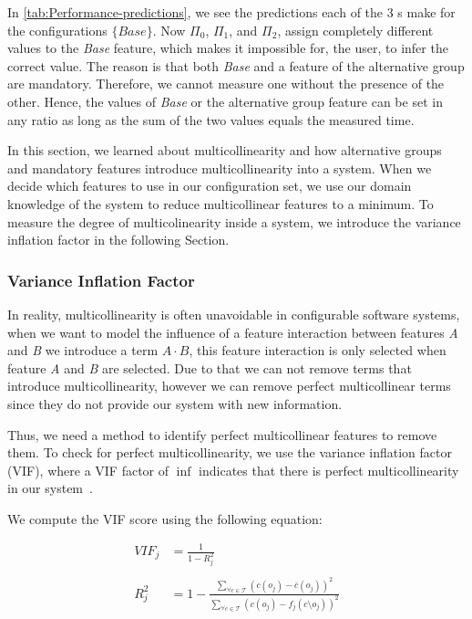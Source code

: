 In \autoref{tab:Performance-predictions}, we see the predictions each of the 3 {\perfInfluenceModel}s make for the configurations $\{Base\}$. 
Now $\Pi_0$, $\Pi_1$, and $\Pi_2$, assign completely different values to the \textit{Base} feature, which makes it impossible for, the user,
to infer the correct value. The reason is that both \textit{Base} and a feature of the alternative group are mandatory. 
Therefore, we cannot measure one without the presence of the other. 
Hence, the values of \textit{Base} or the alternative group feature can be set in any ratio as long as the sum of the two values equals the measured time.

In this section, we learned about multicollinearity and how alternative groups and mandatory features introduce multicollinearity into a system. 
When we decide which features to use in our configuration set, we use our domain knowledge of the system to reduce multicollinear features to a minimum.
To measure the degree of multicolinearity inside a system, we introduce the variance inflation factor in the following Section.

\subsubsection{Variance Inflation Factor}\label{ch:vif}
In reality, multicollinearity is often unavoidable in configurable software systems, when we want to model the influence of a feature interaction between features
\textit{A} and \textit{B} we introduce a term $A \cdot B$, this feature interaction is only selected when feature \textit{A} and \textit{B} are selected. 
Due to that we can not remove terms that introduce multicollinearity, however we can remove perfect multicollinear terms since they do not provide our 
system with new information.

Thus, we need a method to identify perfect multicollinear features to remove them.
To check for perfect multicollinearity, we use the variance inflation factor (\acs{VIF}), where a \acs{VIF} factor of $\inf$ indicates
that there is perfect multicollinearity in our system~\cite{Multicollinearity}.

We compute the \acs{VIF} score using the following equation:

\begin{align}
    VIF_{j} &= \frac{1}{1 - R^{2}_{j}}  \\ \nonumber\\
    R^{2}_{j} &= 1 - \frac{\sum\limits_{\forall c \in \mathcal{T}} (c(o_j) - \overline{c}(o_j))^2} {\sum\limits_{\forall c \in \mathcal{T}}(c(o_j) - f_j(c \setminus o_j))^2}
\end{align}

